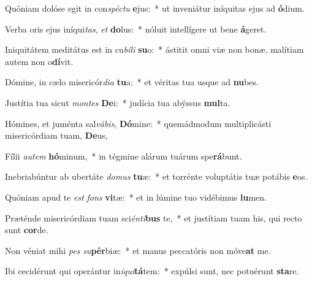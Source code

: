 \item Quóniam dolóse egit in con\textit{spéc}\textit{tu} \textbf{e}jus:~* ut inveniátur iníquitas ejus ad \textbf{ó}dium.
\item Verba oris ejus iníqui\textit{tas}, \textit{et} \textbf{do}lus:~* nóluit intellígere ut bene \textbf{á}geret.
\item Iniquitátem meditátus est in cu\textit{bí}\textit{li} \textbf{su}o:~* ástitit omni viæ non bonæ, malítiam autem non o\textbf{dí}vit.
\item Dómine, in cælo misericór\textit{di}\textit{a} \textbf{tu}a:~* et véritas tua usque ad \textbf{nu}bes.
\item Justítia tua sicut \textit{mon}\textit{tes} \textbf{De}i:~* judícia tua abýssus \textbf{mul}ta.
\item Hómines, et juménta sal\textit{vá}\textit{bis}, \textbf{Dó}mine:~* quemádmodum multiplicásti misericórdiam tuam, \textbf{De}us,
\item Fílii \textit{au}\textit{tem} \textbf{hó}minum,~* in tégmine alárum tuárum spe\textbf{rá}bunt.
\item Inebriabúntur ab ubertáte \textit{do}\textit{mus} \textbf{tu}æ:~* et torrénte voluptátis tuæ potábis \textbf{e}os.
\item Quóniam apud te \textit{est} \textit{fons} \textbf{vi}tæ:~* et in lúmine tuo vidébimus \textbf{lu}men.
\item Præténde misericórdiam tuam sci\textit{én}\textit{ti}\textbf{bus} te,~* et justítiam tuam his, qui recto sunt \textbf{cor}de.
\item Non véniat mihi \textit{pes} \textit{su}\textbf{pér}biæ:~* et manus peccatóris non móve\textbf{at} me.
\item Ibi cecidérunt qui operántur in\textit{i}\textit{qui}\textbf{tá}tem:~* expúlsi sunt, nec potuérunt \textbf{sta}re.
